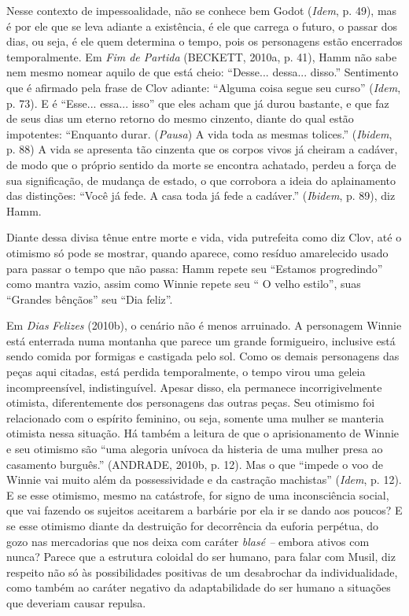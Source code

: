 Nesse contexto de impessoalidade, não se conhece bem Godot (\emph{Idem},
p. 49), mas é por ele que se leva adiante a existência, é ele que
carrega o futuro, o passar dos dias, ou seja, é ele quem determina o
tempo, pois os personagens estão encerrados temporalmente. Em \emph{Fim
de Partida} (BECKETT, 2010a, p. 41), Hamm não sabe nem mesmo nomear
aquilo de que está cheio: ``Desse... dessa... disso.'' Sentimento que é
afirmado pela frase de Clov adiante: ``Alguma coisa segue seu curso''
(\emph{Idem}, p. 73). E é ``Esse... essa... isso'' que eles acham que já
durou bastante, e que faz de seus dias um eterno retorno do mesmo
cinzento, diante do qual estão impotentes: ``Enquanto durar.
(\emph{Pausa}) A vida toda as mesmas tolices.'' (\emph{Ibidem}, p. 88) A
vida se apresenta tão cinzenta que os corpos vivos já cheiram a cadáver,
de modo que o próprio sentido da morte se encontra achatado, perdeu a
força de sua significação, de mudança de estado, o que corrobora a ideia
do aplainamento das distinções: ``Você já fede. A casa toda já fede a
cadáver.'' (\emph{Ibidem}, p. 89), diz Hamm.

Diante dessa divisa tênue entre morte e vida, vida putrefeita como diz
Clov, até o otimismo só pode se mostrar, quando aparece, como resíduo
amarelecido usado para passar o tempo que não passa: Hamm repete seu
``Estamos progredindo'' como mantra vazio, assim como Winnie repete seu
`` O velho estilo'', suas ``Grandes bênçãos'' seu ``Dia feliz''.

Em \emph{Dias} \emph{Felizes} (2010b), o cenário não é menos arruinado.
A personagem Winnie está enterrada numa montanha que parece um grande
formigueiro, inclusive está sendo comida por formigas e castigada pelo
sol. Como os demais personagens das peças aqui citadas, está perdida
temporalmente, o tempo virou uma geleia incompreensível, indistinguível.
Apesar disso, ela permanece incorrigivelmente otimista, diferentemente
dos personagens das outras peças. Seu otimismo foi relacionado com o
espírito feminino, ou seja, somente uma mulher se manteria otimista
nessa situação. Há também a leitura de que o aprisionamento de Winnie e
seu otimismo são ``uma alegoria unívoca da histeria de uma mulher presa
ao casamento burguês.'' (ANDRADE, 2010b, p. 12). Mas o que ``impede o
voo de Winnie vai muito além da possessividade e da castração
machistas'' (\emph{Idem}, p. 12). E se esse otimismo, mesmo na
catástrofe, for signo de uma inconsciência social, que vai fazendo os
sujeitos aceitarem a barbárie por ela ir se dando aos poucos? E se esse
otimismo diante da destruição for decorrência da euforia perpétua, do
gozo nas mercadorias que nos deixa com caráter \emph{blasé --} embora
ativos com nunca? Parece que a estrutura coloidal do ser humano, para
falar com Musil, diz respeito não só às possibilidades positivas de um
desabrochar da individualidade, como também ao caráter negativo da
adaptabilidade do ser humano a situações que deveriam causar repulsa.

